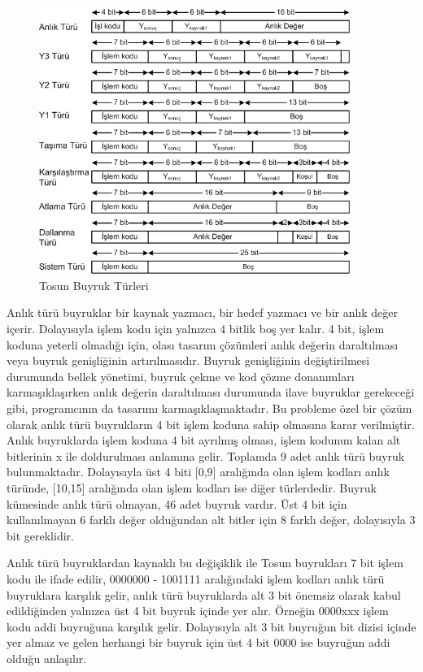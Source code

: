 \begin{figure}[ht]
\centering
\shorthandoff{=}
\includegraphics[width=0.9\textwidth]{gorsel/instructionTypes.png}
\shorthandoff{=}
\caption{Tosun Buyruk Türleri}
\label{image:instructionTypes}
\end{figure}

Anlık türü buyruklar bir kaynak yazmacı, bir hedef yazmacı ve bir anlık değer içerir. Dolayısıyla işlem kodu için yalnızca 4 bitlik boş yer kalır. 4 bit, işlem koduna yeterli olmadığı için, olası tasarım çözümleri anlık değerin daraltılması veya buyruk genişliğinin artırılmasıdır. Buyruk genişliğinin değiştirilmesi durumunda bellek yönetimi, buyruk çekme ve kod çözme donanımları karmaşıklaşırken anlık değerin daraltılması durumunda ilave buyruklar gerekeceği gibi, programcının da tasarımı karmaşıklaşmaktadır. Bu probleme özel bir çözüm olarak anlık türü buyrukların 4 bit işlem koduna sahip olmasına karar verilmiştir. Anlık buyruklarda işlem koduna 4 bit ayrılmış olması, işlem kodunun kalan alt bitlerinin x ile doldurulması anlamına gelir. Toplamda 9 adet anlık türü buyruk bulunmaktadır. Dolayısıyla üst 4 biti [0,9] aralığında olan işlem kodları anlık türünde, [10,15] aralığında olan işlem kodları ise diğer türlerdedir. Buyruk kümesinde anlık türü olmayan, 46 adet buyruk vardır. Üst 4 bit için kullanılmayan 6 farklı değer olduğundan alt bitler için 8 farklı değer, dolayısıyla 3 bit gereklidir. \par

Anlık türü buyruklardan kaynaklı bu değişiklik ile Tosun buyrukları 7 bit işlem kodu ile ifade edilir, 0000000 - 1001111 aralığındaki işlem kodları anlık türü buyruklara karşılık gelir, anlık türü buyruklarda alt 3 bit önemsiz olarak kabul edildiğinden yalnızca üst 4 bit buyruk içinde yer alır. Örneğin 0000xxx işlem kodu addi buyruğuna karşılık gelir. Dolayısıyla alt 3 bit buyruğun bit dizisi içinde yer almaz ve gelen herhangi bir buyruk için üst 4 bit 0000 ise buyruğun addi olduğu anlaşılır. \par



